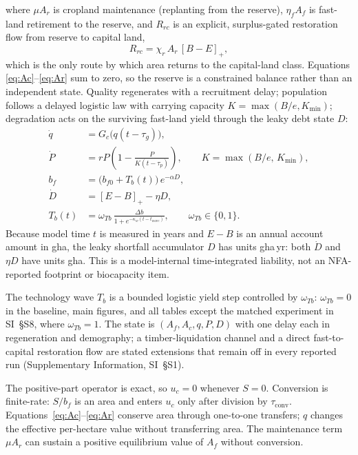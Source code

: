 \documentclass[preprint,12pt,authoryear]{elsarticle}
\newcommand{\pos}[1]{\left[#1\right]_+}
\newcommand{\tconv}{\tau_{\mathrm{conv}}}
\begin{document}
where $\mu A_r$ is cropland maintenance (replanting from the reserve), $\eta_f A_f$ is fast-land retirement to the reserve, and $R_{rc}$ is an explicit, surplus-gated restoration flow from reserve to capital land,
\begin{equation}\label{eq:Rrc}
R_{rc}=\chi_r\,A_r\,\pos{B-E},
\end{equation}
which is the only route by which area returns to the capital-land class. Equations \eqref{eq:Ac}--\eqref{eq:Ar} sum to zero, so the reserve is a constrained balance rather than an independent state. Quality regenerates with a recruitment delay; population follows a delayed logistic law \citep{Pearl1925,Hutchinson1948} with carrying capacity $K=\max(B/e,K_{\min})$; degradation acts on the surviving fast-land yield through the leaky debt state $D$:
\begin{align}
\dot q&=G_c\big(q(t-\tau_g)\big),\label{eq:q}\\
\dot P&=rP\left(1-\frac{P}{K(t-\tau_p)}\right),\qquad K=\max(B/e,\,K_{\min}),\label{eq:P}\\
b_f&=\big(b_{f0}+T_b(t)\big)\,e^{-\alpha D},\label{eq:bf}\\
\dot D&=\pos{E-B}-\eta D,\label{eq:D}\\
T_b(t)&=\omega_{Tb}\,\frac{\Delta b}{1+e^{-\kappa_w(t-t_{wave})}},\qquad \omega_{Tb}\in\{0,1\}.\label{eq:Tb}
\end{align}
Because model time $t$ is measured in years and $E-B$ is an annual account amount in gha, the leaky shortfall accumulator $D$ has units gha\,yr: both $\dot D$ and $\eta D$ have units gha. This is a model-internal time-integrated liability, not an NFA-reported footprint or biocapacity item.

The technology wave $T_b$ is a bounded logistic yield step controlled by $\omega_{Tb}$: $\omega_{Tb}=0$ in the baseline, main figures, and all tables except the matched experiment in SI~\S S8, where $\omega_{Tb}=1$. The state is $(A_f,A_c,q,P,D)$ with one delay each in regeneration and demography; a timber-liquidation channel and a direct fast-to-capital restoration flow are stated extensions that remain off in every reported run (Supplementary Information, SI~\S S1).

The positive-part operator is exact, so $u_c=0$ whenever $S=0$. Conversion is finite-rate: $S/b_f$ is an area and enters $u_c$ only after division by $\tconv$. Equations~\eqref{eq:Ac}--\eqref{eq:Ar} conserve area through one-to-one transfers; $q$ changes the effective per-hectare value without transferring area. The maintenance term $\mu A_r$ can sustain a positive equilibrium value of $A_f$ without conversion.
\end{document}
